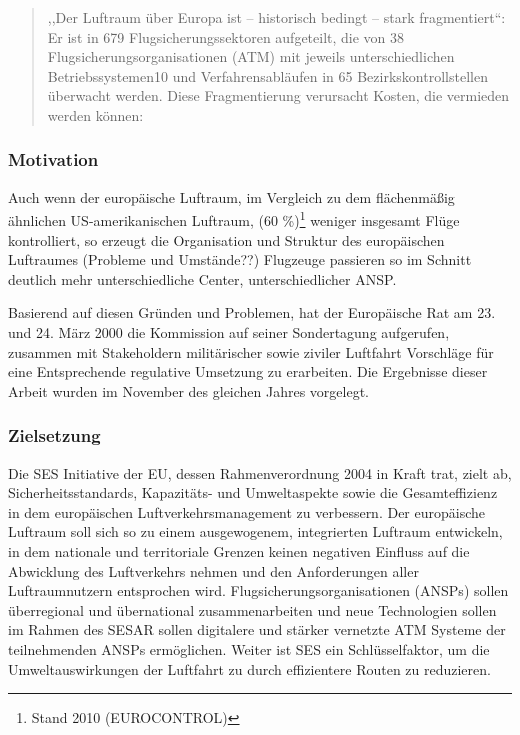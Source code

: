
\begin{quote}
,,Der Luftraum über Europa ist – historisch bedingt – stark fragmentiert``:  Er ist in 679 Flugsicherungssektoren aufgeteilt, die von 38 Flugsicherungsorganisationen (ATM) mit jeweils unterschiedlichen
Betriebssystemen10 und Verfahrensabläufen in 65 Bezirkskontrollstellen überwacht werden. Diese Fragmentierung verursacht Kosten, die vermieden werden können:
\cite[S.6]{eu_ses_studie} 
\end{quote}

\subsubsection{Motivation}
\noindent
Auch wenn der europäische Luftraum, im Vergleich zu dem flächenmäßig ähnlichen US-amerikanischen Luftraum, (60 \%)\footnote{Stand 2010 (EUROCONTROL)} weniger insgesamt Flüge kontrolliert, so erzeugt die Organisation und Struktur des europäischen Luftraumes (Probleme und Umstände??)
Flugzeuge passieren so im Schnitt deutlich mehr unterschiedliche Center, unterschiedlicher ANSP. 
\cite[S. 74]{eu_ses_fab}

Basierend auf diesen Gründen und Problemen, hat der Europäische Rat am 23. und 24. März 2000 die Kommission auf seiner Sondertagung aufgerufen, zusammen mit Stakeholdern militärischer sowie ziviler Luftfahrt Vorschläge für eine Entsprechende regulative Umsetzung zu erarbeiten.
Die Ergebnisse dieser Arbeit wurden im November des gleichen Jahres vorgelegt.
\cite[ErwG. 2]{2004R0549}

\subsubsection{Zielsetzung}

Die \acf{SES} Initiative der \acf{EU}, dessen Rahmenverordnung 2004 in Kraft trat, zielt ab, Sicherheitsstandards, Ka\-pazitäts- und Umweltaspekte sowie die Gesamteffizienz in dem europäischen Luftverkehrsmanagement zu verbessern.
Der europäische Luftraum soll sich so zu einem ausgewogenem, integrierten Luftraum entwickeln, in dem nationale und territoriale Grenzen keinen negativen Einfluss auf die Abwicklung des Luftverkehrs nehmen und den Anforderungen aller Luftraumnutzern entsprochen wird. \cite[Art. 1 Abs. 1]{2004R0549}
Flugsicherungsorganisationen (\acsp{ANSP}) sollen überregional und übernational zusammenarbeiten und neue Technologien sollen im Rahmen des \acf{SESAR} sollen digitalere und stärker vernetzte \acs{ATM} Systeme der teilnehmenden \acp{ANSP} ermöglichen.
Weiter ist \acs{SES} ein Schlüsselfaktor, um die Umweltauswirkungen der Luftfahrt zu durch effizientere Routen zu reduzieren.  

